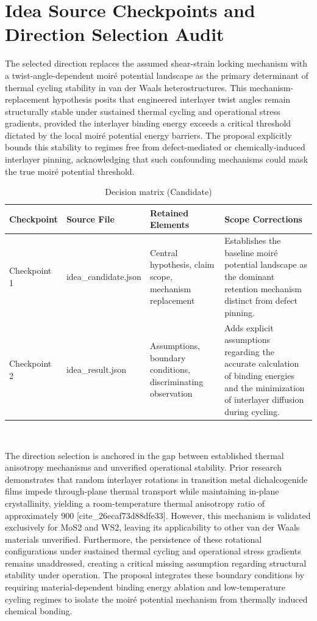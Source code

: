 \documentclass[conference]{IEEEtran}
\begin{document}
\appendices
\section{Idea Source Checkpoints and Direction Selection Audit}
The selected direction replaces the assumed shear-strain locking mechanism with a twist-angle-dependent moiré potential landscape as the primary determinant of thermal cycling stability in van der Waals heterostructures. This mechanism-replacement hypothesis posits that engineered interlayer twist angles remain structurally stable under sustained thermal cycling and operational stress gradients, provided the interlayer binding energy exceeds a critical threshold dictated by the local moiré potential energy barriers. The proposal explicitly bounds this stability to regimes free from defect-mediated or chemically-induced interlayer pinning, acknowledging that such confounding mechanisms could mask the true moiré potential threshold.~\cite{cite_26ecaf73d88dfe33}

\begin{table}[htbp]
\centering
\footnotesize
\setlength{\tabcolsep}{3pt}
\renewcommand{\arraystretch}{1.12}
\caption{Decision matrix (Candidate)}
\label{tab:appendix-idea-evolution-checkpoint-comparison}
\begin{tabular}{|p{}|p{}|p{}|p{}|}
\hline
Checkpoint & Source File & Retained Elements & Scope Corrections \\\hline
Checkpoint 1 & idea\_candidate.json & Central hypothesis, claim scope, mechanism replacement & Establishes the baseline moiré potential landscape as the dominant retention mechanism distinct from defect pinning. \\\hline
Checkpoint 2 & idea\_result.json & Assumptions, boundary conditions, discriminating observation & Adds explicit assumptions regarding the accurate calculation of binding energies and the minimization of interlayer diffusion during cycling. \\\hline
\end{tabular}
\end{table}~\cite{cite_26ecaf73d88dfe33}

The direction selection is anchored in the gap between established thermal anisotropy mechanisms and unverified operational stability. Prior research demonstrates that random interlayer rotations in transition metal dichalcogenide films impede through-plane thermal transport while maintaining in-plane crystallinity, yielding a room-temperature thermal anisotropy ratio of approximately 900 [cite\_26ecaf73d88dfe33]. However, this mechanism is validated exclusively for MoS2 and WS2, leaving its applicability to other van der Waals materials unverified. Furthermore, the persistence of these rotational configurations under sustained thermal cycling and operational stress gradients remains unaddressed, creating a critical missing assumption regarding structural stability under operation. The proposal integrates these boundary conditions by requiring material-dependent binding energy ablation and low-temperature cycling regimes to isolate the moiré potential mechanism from thermally induced chemical bonding.~\cite{cite_26ecaf73d88dfe33}
\end{document}
